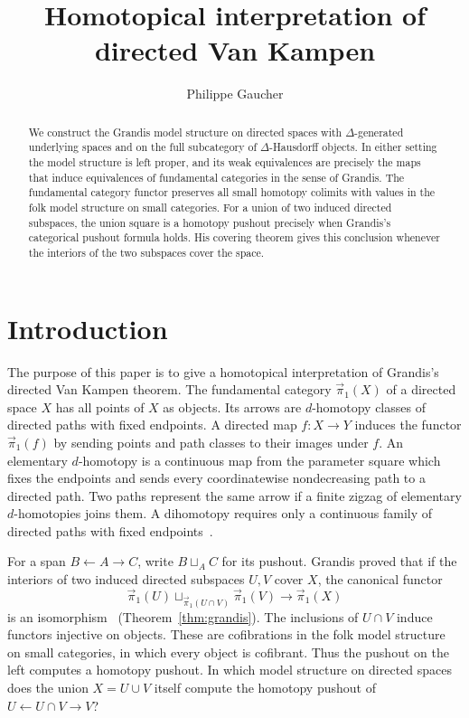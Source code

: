 \documentclass[12pt,a4paper]{amsart}
\title{Homotopical interpretation of directed Van Kampen}
\author[P. Gaucher]{Philippe Gaucher}
\theoremstyle{definition}
\renewcommand{\vec}{\overrightarrow}
\newcommand{\PiC}{\vec{\pi}_1}
\begin{document}
\begin{abstract}
We construct the Grandis model structure on directed spaces with $\Delta$-generated underlying spaces and on the full subcategory of $\Delta$-Hausdorff objects. In either setting the model structure is left proper, and its weak equivalences are precisely the maps that induce equivalences of fundamental categories in the sense of Grandis. The fundamental category functor preserves all small homotopy colimits with values in the folk model structure on small categories. For a union of two induced directed subspaces, the union square is a homotopy pushout precisely when Grandis's categorical pushout formula holds. His covering theorem gives this conclusion whenever the interiors of the two subspaces cover the space.
\end{abstract}

\maketitle
\setcounter{tocdepth}{1}
\tableofcontents
\hypersetup{linkcolor=dark-red}

\section{Introduction}

The purpose of this paper is to give a homotopical interpretation of Grandis's directed Van Kampen theorem. The fundamental category $\PiC(X)$ of a directed space $X$ has all points of $X$ as objects. Its arrows are $d$-homotopy classes of directed paths with fixed endpoints. A directed map $f\colon X\to Y$ induces the functor $\PiC(f)$ by sending points and path classes to their images under $f$. An elementary $d$-homotopy is a continuous map from the parameter square which fixes the endpoints and sends every coordinatewise nondecreasing path to a directed path. Two paths represent the same arrow if a finite zigzag of elementary $d$-homotopies joins them. A dihomotopy requires only a continuous family of directed paths with fixed endpoints~\cite[Definitions~4.34 and~4.49--4.50]{DAT_book}.

For a span $B\leftarrow A\to C$, write $B\sqcup_A C$ for its pushout. Grandis proved that if the interiors of two induced directed subspaces $U,V$ cover $X$, the canonical functor
\[
 \PiC(U)\sqcup_{\PiC(U\cap V)}\PiC(V)\longrightarrow\PiC(X)
\]
is an isomorphism~\cite[Theorem~3.6(a)]{mg} (Theorem~\ref{thm:grandis}). The inclusions of $U\cap V$ induce functors injective on objects. These are cofibrations in the folk model structure on small categories, in which every object is cofibrant. Thus the pushout on the left computes a homotopy pushout. In which model structure on directed spaces does the union $X=U\cup V$ itself compute the homotopy pushout of $U\leftarrow U\cap V\to V$?
\end{document}
